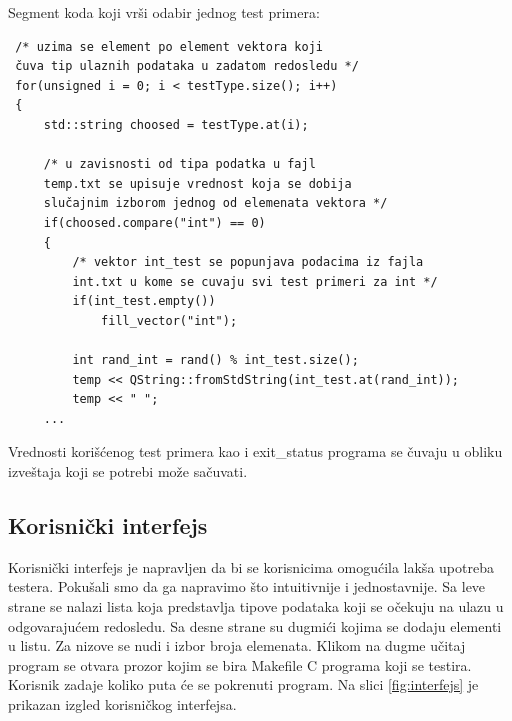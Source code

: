 \documentclass[a4paper]{article}
\begin{document}
{Segment koda koji vrši odabir jednog test primera:
\begin{verbatim}
 /* uzima se element po element vektora koji 
 čuva tip ulaznih podataka u zadatom redosledu */
 for(unsigned i = 0; i < testType.size(); i++)
 {
     std::string choosed = testType.at(i);
     
     /* u zavisnosti od tipa podatka u fajl 
     temp.txt se upisuje vrednost koja se dobija 
     slučajnim izborom jednog od elemenata vektora */
     if(choosed.compare("int") == 0)
     {
         /* vektor int_test se popunjava podacima iz fajla
         int.txt u kome se cuvaju svi test primeri za int */
         if(int_test.empty())
             fill_vector("int"); 
                  
         int rand_int = rand() % int_test.size();
         temp << QString::fromStdString(int_test.at(rand_int));
         temp << " ";
     ...
 \end{verbatim}
 
Vrednosti korišćenog test primera kao i exit\_status programa se čuvaju u obliku izveštaja koji se potrebi može sačuvati.

\subsection{Korisnički interfejs}
\label{subsec:korisnicki_interfejs_testera}

Korisnički interfejs je napravljen da bi se korisnicima omogućila lakša upotreba testera. Pokušali smo da ga napravimo što intuitivnije i jednostavnije. 
Sa leve strane se nalazi lista koja predstavlja tipove podataka koji se očekuju na ulazu u odgovarajućem redosledu. Sa desne strane su dugmići kojima se dodaju elementi u listu. Za nizove se nudi i izbor broja elemenata. Klikom na dugme učitaj program se otvara prozor kojim se bira Makefile C programa koji se testira. Korisnik zadaje koliko puta će se pokrenuti program. Na slici \ref{fig:interfejs} je prikazan izgled korisničkog interfejsa. \\

}
\end{document}
